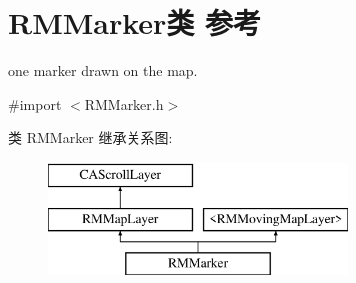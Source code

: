 \hypertarget{interface_r_m_marker}{\section{R\-M\-Marker类 参考}
\label{interface_r_m_marker}
}


one marker drawn on the map.  




{\ttfamily \#import $<$R\-M\-Marker.\-h$>$}

类 R\-M\-Marker 继承关系图\-:\begin{figure}[H]
\begin{center}
\leavevmode
\includegraphics[height=3.000000cm]{interface_r_m_marker}
\end{center}
\end{figure}
